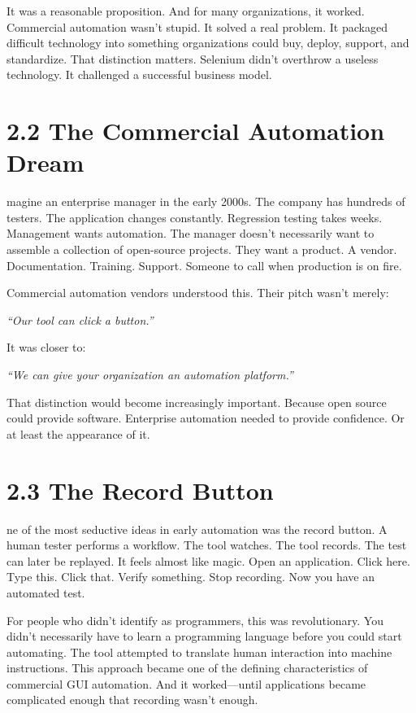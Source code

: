 \documentclass[11pt, a4paper, openany]{book}
\newcommand{\initialcap}[1]{{\fontfamily{lmss}\selectfont\huge\textbf{#1}}}
\begin{document}
It was a reasonable proposition. And for many organizations, it worked. Commercial automation wasn't stupid. It solved a real problem. It packaged difficult technology into something organizations could buy, deploy, support, and standardize. That distinction matters. Selenium didn't overthrow a useless technology. It challenged a successful business model.

\section{2.2 The Commercial Automation Dream}
\noindent \initialcap{I}magine an enterprise manager in the early 2000s. The company has hundreds of testers. The application changes constantly. Regression testing takes weeks. Management wants automation. The manager doesn't necessarily want to assemble a collection of open-source projects. They want a product. A vendor. Documentation. Training. Support. Someone to call when production is on fire.

Commercial automation vendors understood this. Their pitch wasn't merely:
\begin{center}
\textit{``Our tool can click a button.''}
\end{center}
It was closer to:
\begin{center}
\textit{``We can give your organization an automation platform.''}
\end{center}
That distinction would become increasingly important. Because open source could provide software. Enterprise automation needed to provide confidence. Or at least the appearance of it.

\section{2.3 The Record Button}
\noindent \initialcap{O}ne of the most seductive ideas in early automation was the record button. A human tester performs a workflow. The tool watches. The tool records. The test can later be replayed. It feels almost like magic. Open an application. Click here. Type this. Click that. Verify something. Stop recording. Now you have an automated test.

For people who didn't identify as programmers, this was revolutionary. You didn't necessarily have to learn a programming language before you could start automating. The tool attempted to translate human interaction into machine instructions. This approach became one of the defining characteristics of commercial GUI automation. And it worked---until applications became complicated enough that recording wasn't enough.
\end{document}
